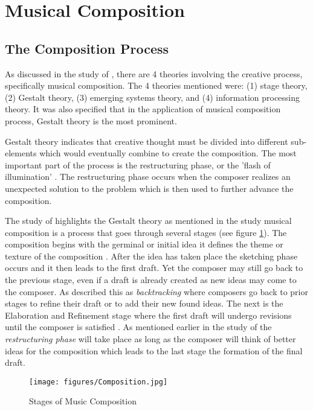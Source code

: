 \section{Musical Composition}
\subsection{The Composition Process}
As discussed in the study of , there are 4 theories involving the creative process, specifically musical composition. The 4 theories mentioned were: (1) stage theory, (2) Gestalt theory, (3) emerging systems theory, and (4) information processing theory. It was also specified that in the application of musical composition process, Gestalt theory is the most prominent. 

Gestalt theory indicates that creative thought must be divided into different sub-elements which would eventually combine to create the composition. The most important part of the process is the restructuring phase, or the 'flash of illumination' \cite{collins2005synthesis}. The restructuring phase occurs when the composer realizes an unexpected solution to the problem which is then used to further advance the composition.

The study of  highlights the Gestalt theory as mentioned in the study musical composition is a process that goes through several stages (see figure \ref{fig:composition}). The composition begins with the germinal  or initial idea it defines the theme or texture of the composition \cite{bennett1976process,collins2005synthesis}. After the idea has taken place the sketching phase occurs and it then leads to the first draft. Yet the composer may still go back to the previous stage, even if a draft is already created as new ideas may come to the composer. As  described this as \textit{backtracking} where composers go back to prior stages to refine their draft or to add their new found ideas. The next is the Elaboration and Refinement stage where the first draft will undergo revisions until the composer is satisfied \cite{bennett1976process}. As mentioned earlier in the study of   the \textit{restructuring phase} will take place as long as the composer will think of better ideas for the composition which leads to the last stage the formation of the final draft.  

\begin{figure}[H]
    \centering
    \texttt{[image: figures/Composition.jpg]}
    \caption{Stages of Music Composition \protect\cite{bennett1976process}}
    \label{fig:composition}
\end{figure}

